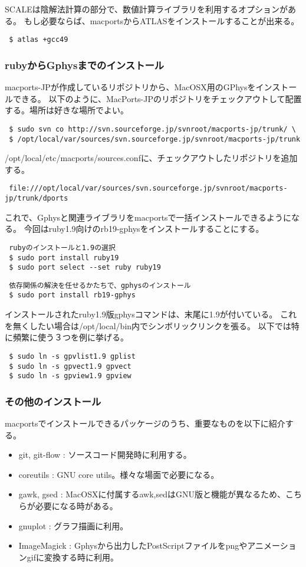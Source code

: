 SCALEは陰解法計算の部分で、数値計算ライブラリを利用するオプションがある。
もし必要ならば、macportsからATLASをインストールすることが出来る。
\begin{verbatim}
 $ atlas +gcc49
\end{verbatim}

\subsubsection{rubyからGphysまでのインストール}

macports-JPが作成しているリポジトリから、MacOSX用のGPhysをインストールできる。
以下のように、MacPorts-JPのリポジトリをチェックアウトして配置する。場所は好きな場所でよい。
\begin{verbatim}
 $ sudo svn co http://svn.sourceforge.jp/svnroot/macports-jp/trunk/ \
 $ /opt/local/var/sources/svn.sourceforge.jp/svnroot/macports-jp/trunk
\end{verbatim}
/opt/local/etc/macports/sources.confに、チェックアウトしたリポジトリを追加する。
\begin{verbatim}
 file:///opt/local/var/sources/svn.sourceforge.jp/svnroot/macports-jp/trunk/dports
\end{verbatim}
これで、Gphysと関連ライブラリをmacportsで一括インストールできるようになる。
今回はruby1.9向けのrb19-gphysをインストールすることにする。

\begin{verbatim}
 rubyのインストールと1.9の選択
 $ sudo port install ruby19
 $ sudo port select --set ruby ruby19
\end{verbatim}
\begin{verbatim}
 依存関係の解決を任せるかたちで、gphysのインストール
 $ sudo port install rb19-gphys
\end{verbatim}

インストールされたruby1.9版gphysコマンドは、末尾に1.9が付いている。
これを無くしたい場合は/opt/local/bin内でシンボリックリンクを張る。
以下では特に頻繁に使う３つを例に挙げる。
\begin{verbatim}
 $ sudo ln -s gpvlist1.9 gplist
 $ sudo ln -s gpvect1.9 gpvect
 $ sudo ln -s gpview1.9 gpview
\end{verbatim}

\subsubsection{その他のインストール}

macportsでインストールできるパッケージのうち、重要なものを以下に紹介する。

\begin{itemize}
\item git, git-flow : ソースコード開発時に利用する。
\item coreutils : GNU core utils。様々な場面で必要になる。
\item gawk, gsed : MacOSXに付属するawk,sedはGNU版と機能が異なるため、こちらが必要になる時がある。
\item gnuplot : グラフ描画に利用。
\item ImageMagick : Gphysから出力したPostScriptファイルをpngやアニメーションgifに変換する時に利用。
\end{itemize}

